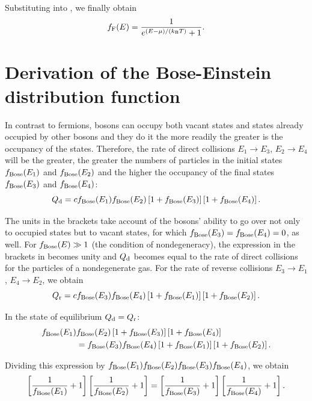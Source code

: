 \noindent
Substituting into , we finally obtain
\begin{equation}\label{eq:II_9}
    f_{\text{F}}(E) = \frac{1}{e^{(E-\mu)/(k_{\text{B}}T)} + 1}.
\end{equation}

\section{Derivation of the Bose-Einstein distribution function}\label{sec:A_III}

In contrast to fermions, bosons can occupy both vacant states and states already occupied by other bosons and they do it the more readily the greater is the occupancy of the states. Therefore, the rate of direct collisions $E_1\to E_3$, $E_2\to E_4$ will be the greater, the greater the numbers of particles in the initial states $f_{\text{Bose}}(E_1)$ and $f_{\text{Bose}}(E_2)$ and the higher the occupancy of the final states $f_{\text{Bose}}(E_3)$ and $f_{\text{Bose}}(E_4)$:
\begin{equation}\label{eq:III_1}
    Q_{\text{d}} = c f_{\text{Bose}}(E_1) f_{\text{Bose}}(E_2) \left[1 + f_{\text{Bose}}(E_3)\right] \left[1 + f_{\text{Bose}}(E_4)\right].
\end{equation}

The units in the brackets take account of the bosons' ability to go over not only to occupied states but to vacant states, for which $f_{\text{Bose}}(E_3)=f_{\text{Bose}}(E_4)=0$, as well. For $f_{\text{Bose}}(E)\gg 1$ (the condition of nondegeneracy), the expression in the brackets in  becomes unity and $Q_{\text{d}}$ becomes equal to the rate of direct collisions for the particles of a nondegenerate gas. For the rate of reverse collisions $E_3\to E_1$, $E_4\to E_2$, we obtain
\begin{equation}\label{eq:III_2}
    Q_{\text{r}} = c f_{\text{Bose}}(E_3) f_{\text{Bose}}(E_4) \left[1 + f_{\text{Bose}}(E_1)\right] \left[1 + f_{\text{Bose}}(E_2)\right].
\end{equation}

In the state of equilibrium $Q_{\text{d}}=Q_{\text{r}}$:
\begin{align}
    f_{\text{Bose}}(E_1) &f_{\text{Bose}}(E_2) \left[1 + f_{\text{Bose}}(E_3)\right] \left[1 + f_{\text{Bose}}(E_4)\right] \nonumber\\
    & = f_{\text{Bose}}(E_3) f_{\text{Bose}}(E_4) \left[1 + f_{\text{Bose}}(E_1)\right] \left[1 + f_{\text{Bose}}(E_2)\right]. \label{eq:III_3}
\end{align}

\noindent
Dividing this expression by $f_{\text{Bose}}(E_1) f_{\text{Bose}}(E_2) f_{\text{Bose}}(E_3) f_{\text{Bose}}(E_4)$, we obtain
\begin{equation}\label{eq:III_4}
    \left[\frac{1}{f_{\text{Bose}}(E_1)} + 1\right] \left[\frac{1}{f_{\text{Bose}}(E_2)} + 1\right] = \left[\frac{1}{f_{\text{Bose}}(E_3)} + 1\right] \left[\frac{1}{f_{\text{Bose}}(E_4)} + 1\right].
\end{equation}

